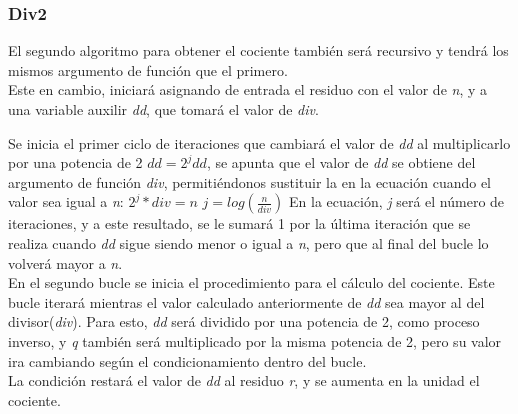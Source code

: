 \documentclass{report}
\begin{document}
        \subsubsection*{Div2}
            El segundo algoritmo para obtener el cociente también será recursivo y tendrá los mismos argumento de función que el primero.\\
            
            Este en cambio, iniciará asignando de entrada el residuo con el valor de \textit{n}, y a una variable auxilir \textit{dd}, que tomará el valor de \textit{div}.
            
            Se inicia el primer ciclo de iteraciones que cambiará el valor de \textit{dd} al multiplicarlo por una potencia de 2 $dd = 2^j dd$, se apunta que el valor de \textit{dd} se obtiene del argumento de función \textit{div}, permitiéndonos sustituir la en la ecuación cuando el valor sea igual a \textit{n}:
            $2^j * div = n$
            $j=log(\frac{n}{div})$
            En la ecuación, \textit{j} será el número de iteraciones, y a este resultado, se le sumará 1 por la última iteración que se realiza cuando \textit{dd} sigue siendo menor o igual a \textit{n}, pero que al final del bucle lo volverá mayor a \textit{n}.\\
            
            En el segundo bucle se inicia el procedimiento para el cálculo del cociente. Este bucle iterará mientras el valor calculado anteriormente de \textit{dd} sea mayor al del divisor(\textit{div}). Para esto, \textit{dd} será dividido por una potencia de 2, como proceso inverso, y \textit{q} también será multiplicado por la misma potencia de 2, pero su valor ira cambiando según el condicionamiento dentro del bucle.\\
            
            La condición restará el valor de \textit{dd} al residuo \textit{r}, y se aumenta en la unidad el cociente.
            
\end{document}
